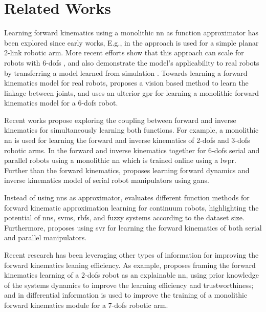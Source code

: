 \section{Related Works}\label{sec: related works}

Learning forward kinematics using a monolithic \gls{nn} as function approximator has been explored since early works, E.g., in \cite{nguyen1990neural} the approach is used for a simple planar 2-link robotic arm.
%
More recent efforts show that this approach can scale for robots with 6-\glspl{dof} \cite{theofanidis2018kinematic}, and also demonstrate the model's applicability to real robots by transferring a model learned from simulation \cite{kesaba2022transfer,kesaba2022forward}. 
%
Towards learning a forward kinematics model for real robots, \cite{dalla2020autonomous} proposes a vision based method to learn the linkage between joints, and uses an ulterior \gls{gpr} for learning a monolithic forward kinematics model for a 6-\glspl{dof} robot.

Recent works propose exploring the coupling between forward and inverse kinematics for simultaneously learning both functions.
%
For example, a monolithic \gls{nn} is used for learning the forward and inverse kinematics of 2-\glspl{dof} \cite{sharkawy2022forward} and 3-\glspl{dof} \cite{sharkawy2023forward} robotic arms.
%
In \cite{damas2012online} the forward and inverse kinematics together for 6-\glspl{dof} serial and parallel robots using a monolithic \gls{nn} which is trained online using a \gls{lwpr}. 
%
Further than the forward kinematics, \cite{ren2020learning} proposes learning forward dynamics and inverse kinematics model of serial robot manipulators using \glspl{gan}.
%

Instead of using \glspl{nn} as approximator, \cite{loutfi2020learning} evaluates different function methods for forward kinematic approximation learning for continuum robots, highlighting the potential of \glspl{nn}, \glspl{svm}, \glspl{rbf}, and fuzzy systems according to the dataset size.
%
Furthermore, \cite{morell2013solving} proposes using \gls{svr} for learning the forward kinematics of both serial and parallel manipulators.


Recent research has been leveraging other types of information for improving the forward kinematics leaning efficiency.
%
As example, \cite{kanneganti2021developing} proposes framing the forward kinematics learning of a 2-\glspl{dof} robot as an explainable \gls{nn}, using prior knowledge of the systems dynamics to improve the learning efficiency and trustworthiness;
%
and in \cite{cursi2022augmented} differential information is used to improve the training of a monolithic forward kinematics module for a 7-\glspl{dof} robotic arm.

